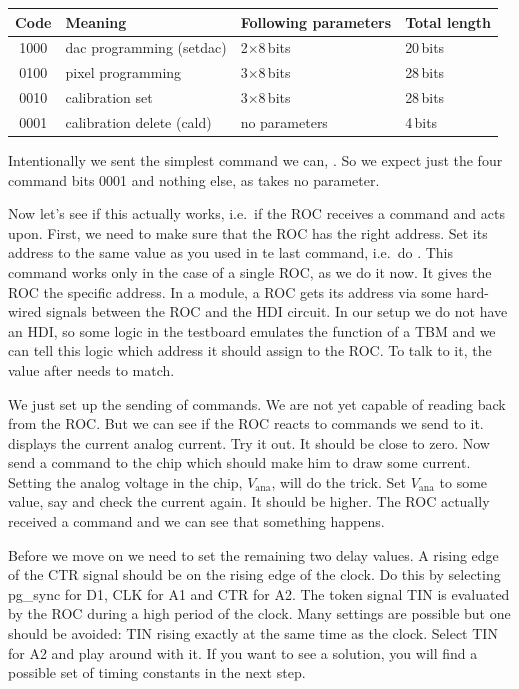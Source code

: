 \bigskip

\begin{tabular}{clll}
    \toprule
    Code & Meaning & Following parameters & Total length \\
    \midrule
    1000 & dac programming (setdac)    & 2$\times$8\,bits & 20\,bits \\
    0100 & pixel programming           & 3$\times$8\,bits & 28\,bits \\
    0010 & calibration set             & 3$\times$8\,bits & 28\,bits \\
    0001 & calibration delete (cald) & no parameters & 4\,bits \\
    \bottomrule
\end{tabular}

\bigskip

Intentionally we sent the simplest command we can, . So we expect just the four command bits 0001 and nothing else, as  takes no parameter.

Now let's see if this actually works, i.e.~if the \gls{ROC} receives a command and acts upon. First, we need to make sure that the \gls{ROC} has the right address. Set its address to the same value as you used in te last  command, i.e.~do . This command works only in the case of a single \gls{ROC}, as we do it now. It gives the \gls{ROC} the specific address. In a module, a \gls{ROC} gets its address via some hard-wired signals between the \gls{ROC} and the \gls{HDI} circuit. In our setup we do not have an \gls{HDI}, so some logic in the testboard emulates the function of a \gls{TBM} and we can tell this logic which address it should assign to the \gls{ROC}. To talk to it, the value after  needs to match.

We just set up the sending of commands. We are not yet capable of reading back from the \gls{ROC}. But we can see if the \gls{ROC} reacts to commands we send to it.  displays the current analog current. Try it out. It should be close to zero. Now send a command to the chip which should make him to draw some current. Setting the analog voltage in the chip, $V_\text{ana}$, will do the trick. Set $V_\text{ana}$ to some value, say  and check the current again. It should be higher. The \gls{ROC} actually received a command and we can see that something happens.

Before we move on we need to set the remaining two delay values. A rising edge of the CTR signal should be on the rising edge of the clock. Do this by selecting pg\_sync for D1, CLK for A1 and CTR for A2. The token signal TIN is evaluated by the \gls{ROC} during a high period of the clock. Many settings are possible but one should be avoided: TIN rising exactly at the same time as the clock. Select TIN for A2 and play around with it. If you want to see a solution, you will find a possible set of timing constants in the next step.

